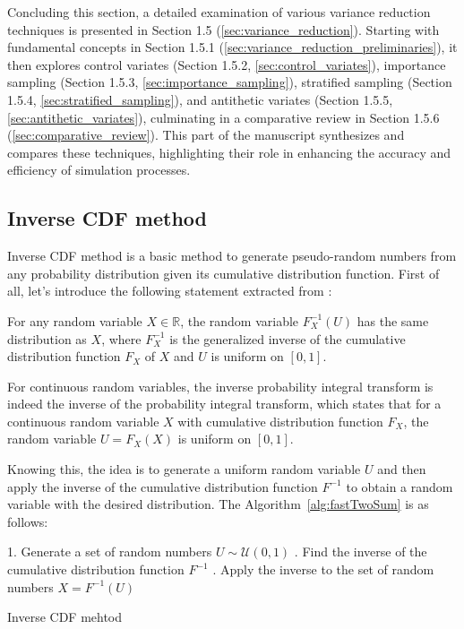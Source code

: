 \documentclass{article}
\begin{document}
Concluding this section, a detailed examination of various variance reduction techniques is presented in Section 1.5 (\ref{sec:variance_reduction}). Starting with fundamental concepts in Section 1.5.1 (\ref{sec:variance_reduction_preliminaries}), it then explores control variates (Section 1.5.2, \ref{sec:control_variates}), importance sampling (Section 1.5.3, \ref{sec:importance_sampling}), stratified sampling (Section 1.5.4, \ref{sec:stratified_sampling}), and antithetic variates (Section 1.5.5, \ref{sec:antithetic_variates}), culminating in a comparative review in Section 1.5.6 (\ref{sec:comparative_review}). This part of the manuscript synthesizes and compares these techniques, highlighting their role in enhancing the accuracy and efficiency of simulation processes.

\subsection{Inverse CDF method}
\label{sec:inverse_cdf}

Inverse CDF method is a basic method to generate pseudo-random numbers from any probability distribution given its cumulative distribution function. First of all, let's introduce the following statement extracted from \cite{wikitInverseTransformSampling}:

\begin{theorem}
	For any random variable $X \in \mathbb{R}$, the random variable $F_X^{-1}(U)$ has the same distribution as $X$, where $F_X^{-1}$ is the generalized inverse of the cumulative distribution function $F_X$ of $X$ and $U$ is uniform on $[0,1]$.

	For continuous random variables, the inverse probability integral transform is indeed the inverse of the probability integral transform, which states that for a continuous random variable $X$ with cumulative distribution function $F_X$, the random variable $U = F_X(X)$ is uniform on $[0,1]$.
\end{theorem}

Knowing this, the idea is to generate a uniform random variable \(U\) and then apply the inverse of the cumulative distribution function \(F^{-1}\) to obtain a random variable with the desired distribution. The Algorithm~\ref{alg:fastTwoSum} is as follows:

\begin{center}
	\begin{minipage}{0.7\linewidth} %
		\begin{algorithm}[H]
			1. Generate a set of random numbers \(U \sim \mathcal{U}(0,1)\) . Find the inverse of the cumulative distribution function \(F^{-1}\) . Apply the inverse to the set of random numbers \(X = F^{-1}(U)\) \;
			\caption{Inverse CDF mehtod} %
			\label{alg:fastTwoSum}   %
		\end{algorithm}
	\end{minipage}
\end{center}
\end{document}
